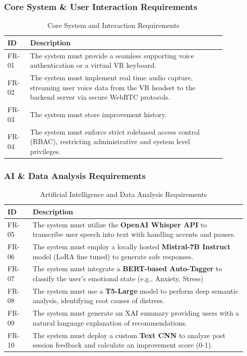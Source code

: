 \subsubsection{Core System \& User Interaction Requirements}
\begin{table}[H]
\centering
\small
\renewcommand{\arraystretch}{1.05}
\caption{Core System and Interaction Requirements}
\label{tab:func-core}
\begin{tabular}{|p{0.09\linewidth}|p{0.78\linewidth}|}
\hline
\rowcolor{gray!15} \textbf{ID} & \textbf{Description} \\ \hline
FR-01 & The system must provide a seamless supporting voice authentication or a virtual VR keyboard. \\ \hline
FR-02 & The system must implement real time audio capture, streaming user voice data from the VR headset to the backend server via secure WebRTC protocols. \\ \hline
FR-03 & The system must store improvement history. \\ \hline
FR-04 & The system must enforce strict rolebased access control (RBAC), restricting administrative and system level privileges. \\ \hline
\end{tabular}
\end{table}

\subsubsection{AI \& Data Analysis Requirements}
\begin{table}[H]
\centering
\renewcommand{\arraystretch}{1.3}
\caption{Artificial Intelligence and Data Analysis Requirements}
\label{tab:func-ai}
\begin{tabular}{|p{0.1\linewidth}|p{0.85\linewidth}|}
\hline
\rowcolor{gray!15} \textbf{ID} & \textbf{Description} \\ \hline
FR-05 & The system must utilize the \textbf{OpenAI Whisper API} to transcribe user speech into text with handling accents and pauses. \\ \hline
FR-06 & The system must employ a locally hosted \textbf{Mistral-7B Instruct} model (LoRA fine tuned) to generate safe responses. \\ \hline
FR-07 & The system must integrate a \textbf{BERT-based Auto-Tagger} to classify the user's emotional state (e.g., Anxiety, Stress) \\ \hline
FR-08 & The system must use a \textbf{T5-Large} model to perform deep semantic analysis, identifying root causes of distress. \\ \hline
FR-09 & The system must generate an XAI summary providing users with a natural language explanation of recommendations. \\ \hline
FR-10 & The system must deploy a custom \textbf{Text CNN} to analyze post session feedback and calculate an improvement score (0-1). \\ \hline
\end{tabular}
\end{table}


